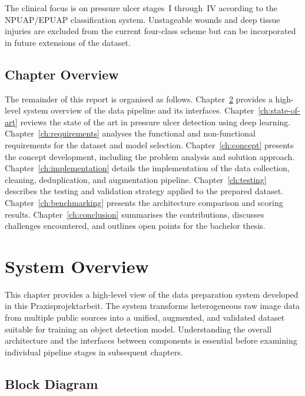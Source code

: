 \documentclass[a4paper,12pt,twoside]{report}
\begin{document}
The clinical focus is on pressure ulcer stages~I through~IV according to the
NPUAP/EPUAP classification system. Unstageable wounds and deep tissue injuries
are excluded from the current four-class scheme but can be incorporated in future
extensions of the dataset.

\section{Chapter Overview}
\label{sec:chapter-overview}

The remainder of this report is organised as follows.
Chapter~\ref{ch:system-overview} provides a high-level system overview of the
data pipeline and its interfaces. Chapter~\ref{ch:state-of-art} reviews the
state of the art in pressure ulcer detection using deep learning.
Chapter~\ref{ch:requirements} analyses the functional and non-functional
requirements for the dataset and model selection.
Chapter~\ref{ch:concept} presents the concept development, including the problem
analysis and solution approach. Chapter~\ref{ch:implementation} details the
implementation of the data collection, cleaning, deduplication, and augmentation
pipeline. Chapter~\ref{ch:testing} describes the testing and validation strategy
applied to the prepared dataset. Chapter~\ref{ch:benchmarking} presents the
architecture comparison and scoring results.
Chapter~\ref{ch:conclusion} summarises the contributions, discusses challenges
encountered, and outlines open points for the bachelor thesis.

\chapter{System Overview}
\label{ch:system-overview}

This chapter provides a high-level view of the data preparation system developed
in this Praxisprojektarbeit. The system transforms heterogeneous raw image data
from multiple public sources into a unified, augmented, and validated dataset
suitable for training an object detection model. Understanding the overall
architecture and the interfaces between components is essential before examining
individual pipeline stages in subsequent chapters.

\section{Block Diagram}
\label{sec:block-diagram}
\end{document}
